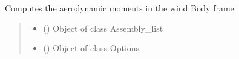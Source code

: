 \documentclass[letterpaper,10pt,english]{sphinxmanual}
\begin{document}
\begin{fulllineitems}
\label{\detokenize{modules:forces.compute_aerodynamic_moments}}
\pysigstartsignatures
{}
\pysigstopsignatures
\sphinxAtStartPar
Computes the aerodynamic moments in the wind Body frame
\begin{quote}\begin{description}
\begin{itemize}
\item {} 
\sphinxAtStartPar
{} ({\hyperref[\detokenize{modules:assembly.Assembly_list}]{}}) \textendash{} Object of class Assembly\_list

\item {} 
\sphinxAtStartPar
{} ({\hyperref[\detokenize{modules:configuration.Options}]{}}) \textendash{} Object of class Options

\end{itemize}

\end{description}\end{quote}

\end{fulllineitems}

\end{document}

